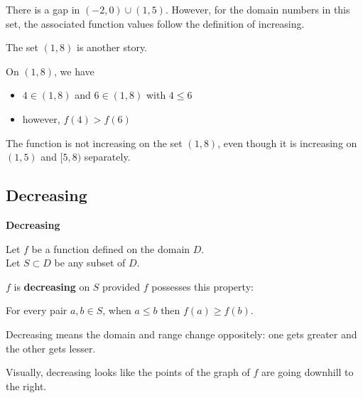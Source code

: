 \documentclass{ximera}
\begin{document}
There is a gap in $(-2,0) \cup (1,5)$.  However, for the domain numbers in this set, the associated function values follow the definition of increasing.   

The set $(1,8)$ is another story.


On $(1,8)$, we have 

\begin{itemize}
\item $4 \in (1,8)$  and  $6 \in (1,8)$  with $4 \leq 6$ \\

\item however, $f(4) > f(6)$
\end{itemize}


The function is not increasing on the set $(1,8)$, even though it is increasing on $(1,5)$ and $[5,8)$ separately. \\














\subsection*{Decreasing}



\begin{definition} \textbf{\textcolor{green!50!black}{Decreasing}} 


Let $f$ be a function defined on the domain $D$. \\
Let $S \subset D$ be any subset of $D$.

$f$ is \textbf{decreasing} on $S$ provided $f$ possesses this property:  


\begin{center}
For every pair $a, b \in S$, when $a \leq b$ then $f(a) \geq f(b)$.
\end{center}

\end{definition}




\begin{idea}
Decreasing means the domain and range change oppositely: one gets greater and the other gets lesser.
\end{idea}


\begin{observation}
Visually, decreasing looks like the points of the graph of $f$ are going downhill to the right.
\end{observation}
\end{document}
